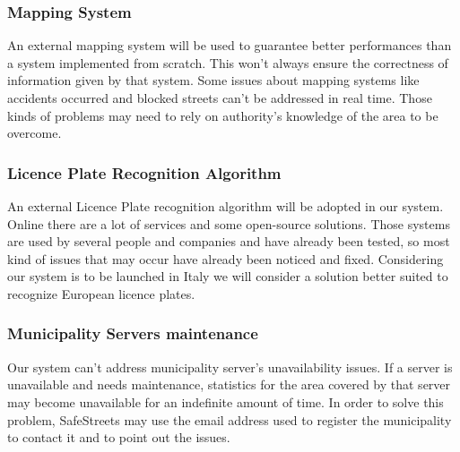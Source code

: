 \subsubsection{ Mapping System }
An external mapping system will be used to guarantee better performances than a system implemented from scratch.
This won’t always ensure the correctness of information given by that system. Some issues about mapping systems like accidents occurred and blocked streets can’t be addressed in real time. Those kinds of problems may need to rely on authority’s knowledge of the area to be overcome.
\subsubsection{Licence Plate Recognition Algorithm}
An external Licence Plate recognition algorithm will be adopted in our system. Online there are a lot of services and some open-source solutions. Those systems are used by several people and companies and have already been tested, so most kind of issues that may occur have already been noticed and fixed. Considering our system is to be launched in Italy we will consider a solution better suited to recognize European licence plates.
\subsubsection{Municipality Servers maintenance}
Our system can’t address municipality server’s unavailability issues. If a server is unavailable and needs maintenance, statistics for the area covered by that server may become unavailable for an indefinite amount of time. In order to solve this problem, SafeStreets may use the email address used to register the municipality to contact it and to point out the issues.
